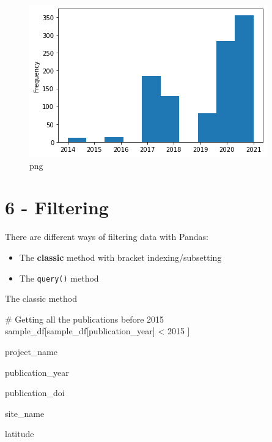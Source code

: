 \documentclass[
  letterpaper,
]{book}
\newenvironment{Shaded}{}{}
\newcommand{\CommentTok}[1]{\textcolor[rgb]{0.42,0.45,0.49}{#1}}
\newcommand{\DecValTok}[1]{\textcolor[rgb]{0.00,0.36,0.77}{#1}}
\newcommand{\NormalTok}[1]{\textcolor[rgb]{0.14,0.16,0.18}{#1}}
\newcommand{\OperatorTok}[1]{\textcolor[rgb]{0.14,0.16,0.18}{#1}}
\newcommand{\StringTok}[1]{\textcolor[rgb]{0.01,0.18,0.38}{#1}}
\providecommand{\tightlist}{%
  \setlength{\itemsep}{0pt}\setlength{\parskip}{0pt}}\usepackage{longtable,booktabs,array}
\begin{document}
\begin{figure}

{\centering \includegraphics{assets/images/chapters/introduction-to-python/tutorial_74_1.png}

}

\caption{png}

\end{figure}

\hypertarget{filtering}{%
\section{6 - Filtering}\label{filtering}}

There are different ways of filtering data with Pandas:

\begin{itemize}
\tightlist
\item
  The \textbf{classic} method with bracket indexing/subsetting
\item
  The \texttt{query()} method
\end{itemize}

The classic method

\begin{Shaded}
\begin{Highlighting}[]
\CommentTok{\# Getting all the publications before 2015}
\NormalTok{sample\_df[sample\_df[}\StringTok{\textquotesingle{}publication\_year\textquotesingle{}}\NormalTok{]  }\OperatorTok{\textless{}} \DecValTok{2015}\NormalTok{ ]}
\end{Highlighting}
\end{Shaded}

project\_name

publication\_year

publication\_doi

site\_name

latitude
\end{document}
